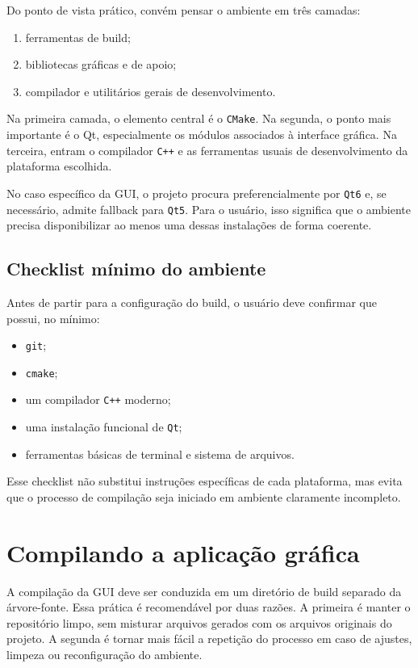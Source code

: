 Do ponto de vista prático, convém pensar o ambiente em três camadas:

\begin{enumerate}
    \item ferramentas de build;
    \item bibliotecas gráficas e de apoio;
    \item compilador e utilitários gerais de desenvolvimento.
\end{enumerate}

Na primeira camada, o elemento central é o \texttt{CMake}. Na segunda, o ponto mais importante é o Qt, especialmente os módulos associados à interface gráfica. Na terceira, entram o compilador \texttt{C++} e as ferramentas usuais de desenvolvimento da plataforma escolhida.

No caso específico da GUI, o projeto procura preferencialmente por \texttt{Qt6} e, se necessário, admite fallback para \texttt{Qt5}. Para o usuário, isso significa que o ambiente precisa disponibilizar ao menos uma dessas instalações de forma coerente.

\subsection{Checklist mínimo do ambiente}
\label{subsec:cap2_checklist_minimo_ambiente}

Antes de partir para a configuração do build, o usuário deve confirmar que possui, no mínimo:
\begin{itemize}
    \item \texttt{git};
    \item \texttt{cmake};
    \item um compilador \texttt{C++} moderno;
    \item uma instalação funcional de \texttt{Qt};
    \item ferramentas básicas de terminal e sistema de arquivos.
\end{itemize}

Esse checklist não substitui instruções específicas de cada plataforma, mas evita que o processo de compilação seja iniciado em ambiente claramente incompleto.

\section{Compilando a aplicação gráfica}
\label{sec:cap2_compilando_aplicacao_grafica}

A compilação da GUI deve ser conduzida em um diretório de build separado da árvore-fonte. Essa prática é recomendável por duas razões. A primeira é manter o repositório limpo, sem misturar arquivos gerados com os arquivos originais do projeto. A segunda é tornar mais fácil a repetição do processo em caso de ajustes, limpeza ou reconfiguração do ambiente.

